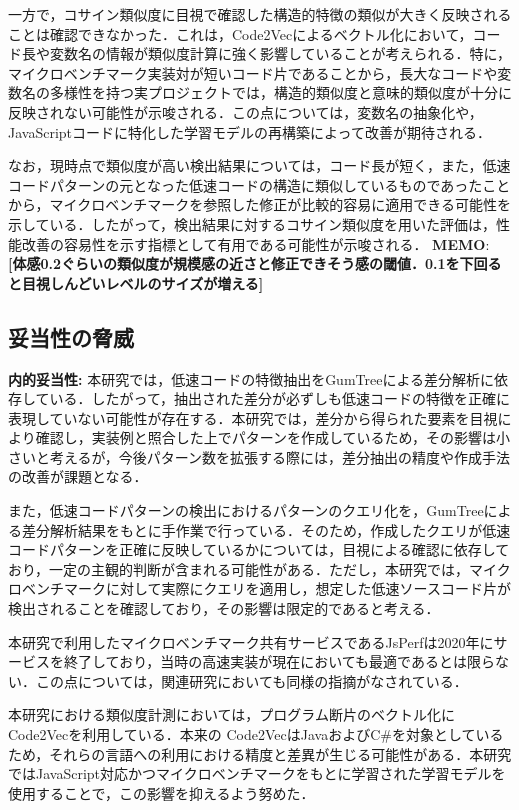 \documentclass[submit,techrep,noauthor]{ipsj}
\newcommand{\memo}[1]{\colorbox{magenta!30}{{\bf MEMO}:}{\color{red!50} {\textbf{[#1]}}}}
\begin{document}
一方で，コサイン類似度に目視で確認した構造的特徴の類似が大きく反映されることは確認できなかった．これは，Code2Vecによるベクトル化において，コード長や変数名の情報が類似度計算に強く影響していることが考えられる．特に，マイクロベンチマーク実装対が短いコード片であることから，長大なコードや変数名の多様性を持つ実プロジェクトでは，構造的類似度と意味的類似度が十分に反映されない可能性が示唆される．この点については，変数名の抽象化や，JavaScriptコードに特化した学習モデルの再構築によって改善が期待される．

なお，現時点で類似度が高い検出結果については，コード長が短く，また，低速コードパターンの元となった低速コードの構造に類似しているものであったことから，マイクロベンチマークを参照した修正が比較的容易に適用できる可能性を示している．したがって，検出結果に対するコサイン類似度を用いた評価は，性能改善の容易性を示す指標として有用である可能性が示唆される．
\memo{体感0.2ぐらいの類似度が規模感の近さと修正できそう感の閾値．0.1を下回ると目視しんどいレベルのサイズが増える}


\subsection{妥当性の脅威}

\noindent\textbf{内的妥当性: }
本研究では，低速コードの特徴抽出をGumTreeによる差分解析に依存している．したがって，抽出された差分が必ずしも低速コードの特徴を正確に表現していない可能性が存在する．本研究では，差分から得られた要素を目視により確認し，実装例と照合した上でパターンを作成しているため，その影響は小さいと考えるが，今後パターン数を拡張する際には，差分抽出の精度や作成手法の改善が課題となる．

また，低速コードパターンの検出におけるパターンのクエリ化を，GumTreeによる差分解析結果をもとに手作業で行っている．そのため，作成したクエリが低速コードパターンを正確に反映しているかについては，目視による確認に依存しており，一定の主観的判断が含まれる可能性がある．ただし，本研究では，マイクロベンチマークに対して実際にクエリを適用し，想定した低速ソースコード片が検出されることを確認しており，その影響は限定的であると考える．

本研究で利用したマイクロベンチマーク共有サービスであるJsPerfは2020年にサービスを終了しており，当時の高速実装が現在においても最適であるとは限らない．この点については，関連研究\cite{omori}においても同様の指摘がなされている．

本研究における類似度計測においては，プログラム断片のベクトル化にCode2Vecを利用している．本来の Code2VecはJavaおよびC\#を対象としているため，それらの言語への利用における精度と差異が生じる可能性がある．本研究ではJavaScript対応かつマイクロベンチマークをもとに学習された学習モデル\cite{saiki}を使用することで，この影響を抑えるよう努めた．
\end{document}
